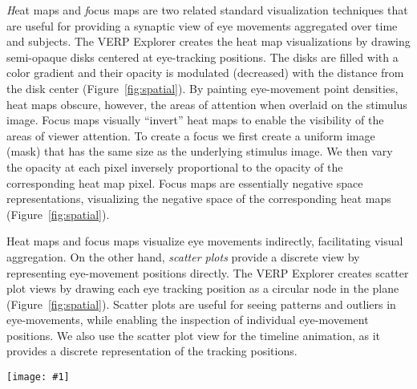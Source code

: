 \documentclass{sigchi}
\newcommand{\insertpicture}[2]{\begin{center}\texttt{[image: \#1]}\end{center}}
\begin{document}
{\emph Heat maps} and {\emph focus maps} are two related standard
visualization techniques that are useful for providing a synaptic view of
eye movements aggregated over time and subjects. The VERP Explorer creates
the heat map visualizations by drawing semi-opaque disks centered at
eye-tracking positions. The disks are filled with a color gradient and
their opacity is modulated (decreased) with the distance from the disk
center (Figure~\ref{fig:spatial}). By painting eye-movement point densities, heat
maps obscure, however, the areas of attention when overlaid on the stimulus
image. Focus maps visually “invert” heat maps to enable the visibility of
the areas of viewer attention. To create a focus we first create a uniform
image (mask) that has the same size as the underlying stimulus image. We
then vary the opacity at each pixel inversely proportional to the opacity
of the corresponding heat map pixel. Focus maps are essentially negative
space representations, visualizing the negative space of the corresponding
heat maps (Figure~\ref{fig:spatial}). 

Heat maps and focus maps visualize eye movements indirectly, facilitating
visual aggregation. On the other hand, {\em scatter plots} provide a
discrete view by representing eye-movement positions directly. The VERP
Explorer creates scatter plot views by drawing each eye tracking position
as a circular node in the plane (Figure~\ref{fig:spatial}). Scatter plots 
are useful for
seeing patterns and outliers in eye-movements, while enabling the
inspection of individual eye-movement positions. We also use the scatter
plot view for the timeline animation, as it provides a  discrete
representation of the tracking positions.

\begin{figure*}
	\insertpicture{figures/spatial.pdf}{0.9}
	\caption{ Three spatial eye-tracking visualizations from the VERP
		Explorer: Heat map (left), focus map (middle), and scatter plot
		(right). \label{fig:spatial} }

\end{figure*}
\end{document}
